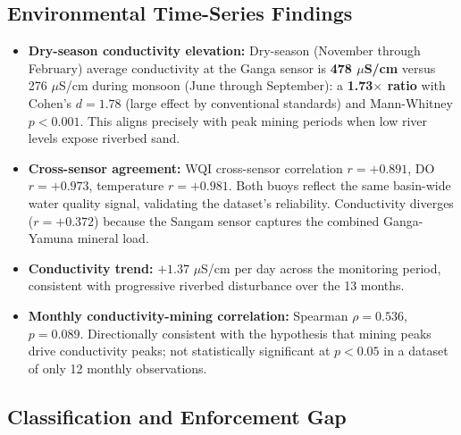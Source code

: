 \documentclass[12pt]{article}
\begin{document}
\subsection{Environmental Time-Series Findings}

\begin{itemize}
    \item \textbf{Dry-season conductivity elevation:} Dry-season (November through February) average conductivity at the Ganga sensor is \textbf{478 $\mu$S/cm} versus 276 $\mu$S/cm during monsoon (June through September): a \textbf{1.73$\times$ ratio} with Cohen's $d = 1.78$ (large effect by conventional standards) and Mann-Whitney $p < 0.001$. This aligns precisely with peak mining periods when low river levels expose riverbed sand.
    \item \textbf{Cross-sensor agreement:} WQI cross-sensor correlation $r = +0.891$, DO $r = +0.973$, temperature $r = +0.981$. Both buoys reflect the same basin-wide water quality signal, validating the dataset's reliability. Conductivity diverges ($r = +0.372$) because the Sangam sensor captures the combined Ganga-Yamuna mineral load.
    \item \textbf{Conductivity trend:} $+1.37$ $\mu$S/cm per day across the monitoring period, consistent with progressive riverbed disturbance over the 13 months.
    \item \textbf{Monthly conductivity-mining correlation:} Spearman $\rho = 0.536$, $p = 0.089$. Directionally consistent with the hypothesis that mining peaks drive conductivity peaks; not statistically significant at $p < 0.05$ in a dataset of only 12 monthly observations.
\end{itemize}

\subsection{Classification and Enforcement Gap}
\end{document}

